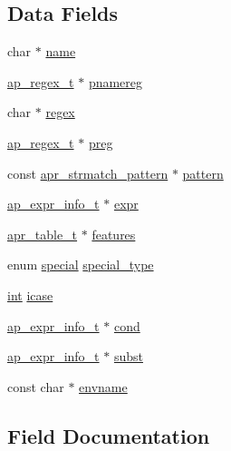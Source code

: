 \subsection*{Data Fields}
\begin{DoxyCompactItemize}
\item 
char $\ast$ \hyperlink{structsei__entry_a94987315f5d913df9d6e25ba464c2be5}{name}
\item 
\hyperlink{structap__regex__t}{ap\+\_\+regex\+\_\+t} $\ast$ \hyperlink{structsei__entry_afe620c6795ee0ec28eb89a2129564635}{pnamereg}
\item 
char $\ast$ \hyperlink{structsei__entry_ab1daf02ba0579b14e49879942dbff21a}{regex}
\item 
\hyperlink{structap__regex__t}{ap\+\_\+regex\+\_\+t} $\ast$ \hyperlink{structsei__entry_ae35c7c482d8737e538512c13fe7d4035}{preg}
\item 
const \hyperlink{structapr__strmatch__pattern}{apr\+\_\+strmatch\+\_\+pattern} $\ast$ \hyperlink{structsei__entry_a39460ad568de81c9a36b0561306f06cf}{pattern}
\item 
\hyperlink{structap__expr__info__t}{ap\+\_\+expr\+\_\+info\+\_\+t} $\ast$ \hyperlink{structsei__entry_a418143d1eaa05d4ea82b32acad68dda2}{expr}
\item 
\hyperlink{structapr__table__t}{apr\+\_\+table\+\_\+t} $\ast$ \hyperlink{structsei__entry_a4b0ed0bb82ecc529d0cff85162f2ca34}{features}
\item 
enum \hyperlink{mod__setenvif_8c_a5b362f825d53bf06a2efba530bf5294d}{special} \hyperlink{structsei__entry_a87f0c367adab2907a00c91693971fe8f}{special\+\_\+type}
\item 
\hyperlink{pcre_8txt_a42dfa4ff673c82d8efe7144098fbc198}{int} \hyperlink{structsei__entry_a8304e4832de90ccb210b206c1dc75a7e}{icase}
\item 
\hyperlink{structap__expr__info__t}{ap\+\_\+expr\+\_\+info\+\_\+t} $\ast$ \hyperlink{structsei__entry_ae8e2b39a02ca1b99e120dff965537bff}{cond}
\item 
\hyperlink{structap__expr__info__t}{ap\+\_\+expr\+\_\+info\+\_\+t} $\ast$ \hyperlink{structsei__entry_a5e6c40bedfa1b96996da1599c8f18c3e}{subst}
\item 
const char $\ast$ \hyperlink{structsei__entry_afeb81ed73b6a3c07b148b1e175d33c48}{envname}
\end{DoxyCompactItemize}


\subsection{Field Documentation}

